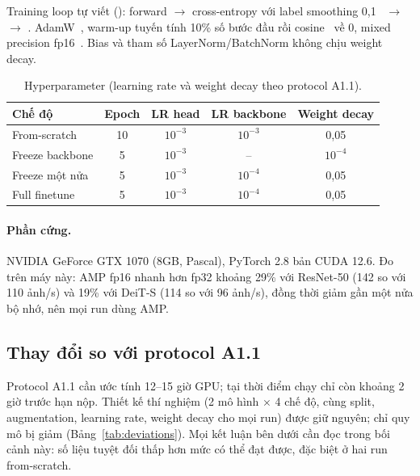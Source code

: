 \documentclass[11pt, a4paper]{article}
\begin{document}
Training loop tự viết (): forward $\rightarrow$ cross-entropy với label smoothing 0,1~\cite{szegedy2016rethinking} $\rightarrow$  $\rightarrow$ . AdamW~\cite{loshchilov2019adamw}, warm-up tuyến tính 10\% số bước đầu rồi cosine~\cite{loshchilov2017sgdr} về 0, mixed precision fp16~\cite{micikevicius2018mixed}. Bias và tham số LayerNorm/BatchNorm không chịu weight decay.

\begin{table}[H]
  \centering
  \caption{Hyperparameter (learning rate và weight decay theo protocol A1.1).}
  \label{tab:hparams}
  \begin{tabular}{lcccc}
    \toprule
    \textbf{Chế độ} & \textbf{Epoch} & \textbf{LR head} & \textbf{LR backbone} & \textbf{Weight decay} \\
    \midrule
    From-scratch    & 10 & $10^{-3}$ & $10^{-3}$ & 0,05 \\
    Freeze backbone & 5  & $10^{-3}$ & --        & $10^{-4}$ \\
    Freeze một nửa  & 5  & $10^{-3}$ & $10^{-4}$ & 0,05 \\
    Full finetune   & 5  & $10^{-3}$ & $10^{-4}$ & 0,05 \\
    \bottomrule
  \end{tabular}
\end{table}

\paragraph{Phần cứng.} NVIDIA GeForce GTX 1070 (8GB, Pascal), PyTorch 2.8 bản CUDA 12.6. Đo trên máy này: AMP fp16 nhanh hơn fp32 khoảng 29\% với ResNet-50 (142 so với 110 ảnh/s) và 19\% với DeiT-S (114 so với 96 ảnh/s), đồng thời giảm gần một nửa bộ nhớ, nên mọi run dùng AMP.

\subsection{Thay đổi so với protocol A1.1}

Protocol A1.1 cần ước tính 12--15 giờ GPU; tại thời điểm chạy chỉ còn khoảng 2 giờ trước hạn nộp. Thiết kế thí nghiệm (2 mô hình $\times$ 4 chế độ, cùng split, augmentation, learning rate, weight decay cho mọi run) được giữ nguyên; chỉ quy mô bị giảm (Bảng~\ref{tab:deviations}). Mọi kết luận bên dưới cần đọc trong bối cảnh này: số liệu tuyệt đối thấp hơn mức có thể đạt được, đặc biệt ở hai run from-scratch.
\end{document}

